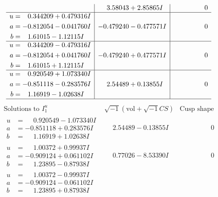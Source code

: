 \documentclass[1p]{elsarticle_modified}
\theoremstyle{definition}
\newcommand{\I}{\sqrt{-1}}
\begin{document}
$$\begin{array}{c|c|c}
 & \phantom{-}3.58043 + 2.85865 I & \phantom{-0.000000 } 0 \\ \hline\begin{aligned}
u &= \phantom{-}0.344209 + 0.479316 I \\
a &= -0.812054 - 0.041760 I \\
b &= \phantom{-}1.61015 - 1.12115 I\end{aligned}
 & -0.479240 - 0.477571 I & \phantom{-0.000000 } 0 \\ \hline\begin{aligned}
u &= \phantom{-}0.344209 - 0.479316 I \\
a &= -0.812054 + 0.041760 I \\
b &= \phantom{-}1.61015 + 1.12115 I\end{aligned}
 & -0.479240 + 0.477571 I & \phantom{-0.000000 } 0 \\ \hline\begin{aligned}
u &= \phantom{-}0.920549 + 1.073340 I \\
a &= -0.851118 - 0.283576 I \\
b &= \phantom{-}1.16919 - 1.02638 I\end{aligned}
 & \phantom{-}2.54489 + 0.13855 I & \phantom{-0.000000 } 0\\
 \hline 
 \end{array}$$\newpage$$\begin{array}{c|c|c}  
\text{Solutions to }I^u_{1}& \I (\text{vol} + \sqrt{-1}CS) & \text{Cusp shape}\\
 \hline 
\begin{aligned}
u &= \phantom{-}0.920549 - 1.073340 I \\
a &= -0.851118 + 0.283576 I \\
b &= \phantom{-}1.16919 + 1.02638 I\end{aligned}
 & \phantom{-}2.54489 - 0.13855 I & \phantom{-0.000000 } 0 \\ \hline\begin{aligned}
u &= \phantom{-}1.00372 + 0.99937 I \\
a &= -0.909124 + 0.061102 I \\
b &= \phantom{-}1.23895 - 0.87938 I\end{aligned}
 & \phantom{-}0.77026 - 8.53390 I & \phantom{-0.000000 } 0 \\ \hline\begin{aligned}
u &= \phantom{-}1.00372 - 0.99937 I \\
a &= -0.909124 - 0.061102 I \\
b &= \phantom{-}1.23895 + 0.87938 I\end{aligned}

\end{array}$$
\end{document}
